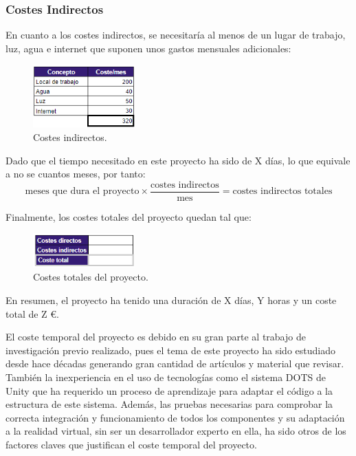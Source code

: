         \subsubsection{Costes Indirectos}
        En cuanto a los costes indirectos, se necesitaría al menos de un lugar de trabajo, luz, agua e internet que suponen unos gastos mensuales adicionales:
        \begin{figure}[H]
            \centering
            \includegraphics[width=0.35\textwidth]{img/costes-indirectos.png}
            \caption{Costes indirectos.}
            \label{fig:costes-indirectos}
        \end{figure}

        Dado que el tiempo necesitado en este proyecto ha sido de X días, lo que equivale a no se cuantos meses, por tanto:
        \[ \text{meses que dura el proyecto} \times \frac{\text{costes indirectos}}{\text{mes}} = \text{costes indirectos totales} \]

        Finalmente, los costes totales del proyecto quedan tal que:

        \begin{figure}[H]
            \centering
            \includegraphics[width=0.35\textwidth]{img/costes-totales.png}
            \caption{Costes totales del proyecto.}
            \label{fig:costes-indirectos}
        \end{figure}

        En resumen, el proyecto ha tenido una duración de X días, Y horas y un coste total de Z €. 
        
        El coste temporal del proyecto es debido en su gran parte al trabajo de investigación previo realizado, pues el tema de este proyecto ha sido estudiado desde hace décadas generando gran cantidad de artículos y material que revisar. También la inexperiencia en el uso de tecnologías como el sistema DOTS de Unity que ha requerido un proceso de aprendizaje para adaptar el código a la estructura de este sistema. Además, las pruebas necesarias para comprobar la correcta integración y funcionamiento de todos los componentes y su adaptación a la realidad virtual, sin ser un desarrollador experto en ella, ha sido otros de los factores claves que justifican el coste temporal del proyecto.

